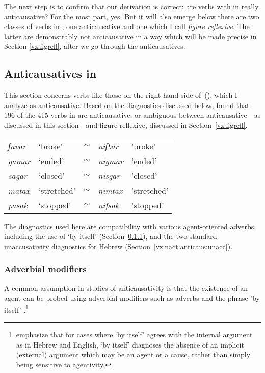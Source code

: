 The next step is to confirm that our derivation is correct: are verbs with {\vz} in {\tnif} really anticausative? For the most part, yes. But it will also emerge below there are two classes of verbs in {\tnif}, one anticausative and one which I call \emph{figure reflexive}. The latter are demonstrably not anticausative in a way which will be made precise in Section \ref{vz:figrefl}, after we go through the anticausatives.

	\subsection{Anticausatives in {\tnif}} \label{vz:nact:anticaus}
This section concerns verbs like those on the right-hand side of~(\nextx), which I analyze as anticausative. Based on the diagnostics discussed below, \cite{ahdoutkastner18} found that 196 of the 415 verbs in {\tnif} are anticausative, or ambiguous between anticausative---as discussed in this section---and figure reflexive, discussed in Section~\ref{vz:figrefl}.
\ex \begin{tabular}{lllll}
	\emph{ʃavar} & `broke' & $\sim$ & \emph{niʃbar}  & 'broke' \\
    \emph{gamar} & `ended' & $\sim$ & \emph{nigmar}  & 'ended' \\
    \emph{sagar} & `closed' & $\sim$  & \emph{nisgar}  & 'closed'\\
    \emph{matax} & `stretched' & $\sim$ & \emph{nimtax}  & 'stretched' \\
    \emph{pasak} & `stopped' & $\sim$ & \emph{nifsak}  & 'stopped' \\
   \end{tabular}
\xe

The diagnostics used here are compatibility with various agent-oriented adverbs, including the use of `by itself’ (Section~\ref{vz:nact:anticaus:adv}), and the two standard unaccusativity diagnostics for Hebrew (Section~\ref{vz:nact:anticaus:unacc}).

		\subsubsection{Adverbial modifiers} \label{vz:nact:anticaus:adv}
A common assumption in studies of anticausativity is that the existence of an agent can be probed using adverbial modifiers such as adverbs and the phrase 'by itself' \citep{unaccusativity95,alexiadouanagnostopoulou04,layering15,alexiadoudoron12,koontzgarboden09,kastner17gjgl}.\footnote{\cite{layering15} emphasize that for cases where `by itself' agrees with the internal argument as in Hebrew and English, `by itself' diagnoses the absence of an implicit (external) argument which may be an agent or a cause, rather than simply being sensitive to agentivity.}

